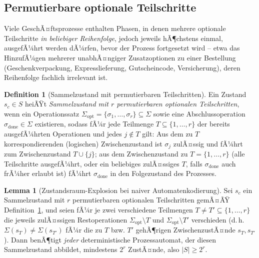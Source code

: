 ﻿\documentclass[a4paper,12pt]{article}
\theoremstyle{definition}
\newtheorem{definition}{Definition}
\newtheorem{lemma}{Lemma}
\begin{document}
\subsection{Permutierbare optionale Teilschritte}
\label{sec:permutierbar}

Viele GeschÃ¤ftsprozesse enthalten Phasen, in denen mehrere optionale Teilschritte
\emph{in beliebiger Reihenfolge}, jedoch jeweils hÃ¶chstens einmal, ausgefÃ¼hrt werden
dÃ¼rfen, bevor der Prozess fortgesetzt wird -- etwa das HinzufÃ¼gen mehrerer unabhÃ¤ngiger
Zusatzoptionen zu einer Bestellung (Geschenkverpackung, Expresslieferung, Gutscheincode,
Versicherung), deren Reihenfolge fachlich irrelevant ist.

\begin{definition}[Sammelzustand mit permutierbaren Teilschritten]
	\label{def:sammelzustand}
	Ein Zustand $s_c \in S$ heiÃŸt \emph{Sammelzustand mit $r$ permutierbaren optionalen
	Teilschritten}, wenn ein Operationssatz
	$\Sigma_{\mathrm{opt}} = \{\sigma_1,\ldots,\sigma_r\} \subseteq \Sigma$ sowie eine
	Abschlussoperation $\sigma_{\mathrm{done}} \in \Sigma$ existieren, sodass fÃ¼r jede
	Teilmenge $T \subseteq \{1,\ldots,r\}$ der bereits ausgefÃ¼hrten Operationen und jedes
	$j \notin T$ gilt: Aus dem zu $T$ korrespondierenden (logischen) Zwischenzustand ist
	$\sigma_j$ zulÃ¤ssig und fÃ¼hrt zum Zwischenzustand $T \cup \{j\}$; aus dem
	Zwischenzustand zu $T=\{1,\ldots,r\}$ (alle Teilschritte ausgefÃ¼hrt, oder ein
	beliebiges zulÃ¤ssiges $T$, falls $\sigma_{\mathrm{done}}$ auch frÃ¼her erlaubt ist)
	fÃ¼hrt $\sigma_{\mathrm{done}}$ in den Folgezustand des Prozesses.
\end{definition}

\begin{lemma}[Zustandsraum-Explosion bei naiver Automatenkodierung]
	\label{lem:zustandsexplosion}
	Sei $s_c$ ein Sammelzustand mit $r$ permutierbaren optionalen Teilschritten gemÃ¤ÃŸ
	Definition~\ref{def:sammelzustand}, und seien fÃ¼r je zwei verschiedene Teilmengen
	$T \neq T' \subseteq \{1,\ldots,r\}$ die jeweils zulÃ¤ssigen Restoperationen
	$\Sigma_{\mathrm{opt}} \setminus T$ und $\Sigma_{\mathrm{opt}} \setminus T'$
	verschieden (d.\,h. $\Sigma(s_T) \neq \Sigma(s_{T'})$ fÃ¼r die zu $T$ bzw. $T'$
	gehÃ¶rigen ZwischenzustÃ¤nde $s_T,s_{T'}$). Dann benÃ¶tigt \emph{jeder} deterministische
	Prozessautomat, der diesen Sammelzustand abbildet, mindestens $2^r$ ZustÃ¤nde, also
	$|S| \geq 2^r$.
\end{lemma}
\end{document}
